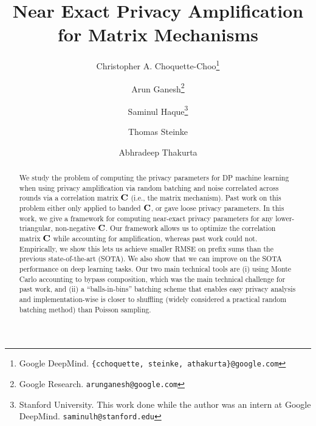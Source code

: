 \documentclass{article} %
\title{Near Exact Privacy Amplification for Matrix Mechanisms}
\author{
Christopher A. Choquette-Choo\thanks{Google DeepMind. \texttt{\{cchoquette, steinke, athakurta\}@google.com}}
\and 
Arun Ganesh\thanks{Google Research. \texttt{arunganesh@google.com}}
\and
Saminul Haque\thanks{Stanford University. This work done while the author was an intern at Google DeepMind. \texttt{saminulh@stanford.edu}}
\and 
Thomas Steinke\samethanks[1]
\and 
Abhradeep Thakurta\samethanks[1]
}
\begin{document}
\maketitle

\begin{abstract}
We study the problem of computing the privacy parameters for DP machine learning when using privacy amplification via random batching and noise correlated across rounds via a correlation matrix $\mathbf{C}$ (i.e., the matrix mechanism). Past work on this problem either only applied to banded $\mathbf{C}$, or gave loose privacy parameters. In this work, we give a framework for computing near-exact privacy parameters for any lower-triangular, non-negative $\mathbf{C}$. Our framework allows us to optimize the correlation matrix $\mathbf{C}$ while accounting for amplification, whereas past work could not. Empirically, we show this lets us achieve smaller RMSE on prefix sums than the previous state-of-the-art (SOTA).
We also show that we can improve on the SOTA performance on deep learning tasks. Our two main technical tools are (i) using Monte Carlo accounting to bypass composition, which was the main technical challenge for past work, and (ii) a ``balls-in-bins'' batching scheme that enables easy privacy analysis and implementation-wise is closer to shuffling (widely considered a practical random batching method) than Poisson sampling. 
\end{abstract}









\appendix


\end{document}
